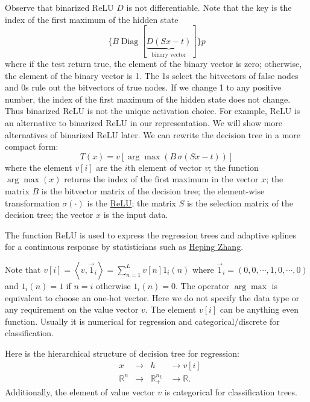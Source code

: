 \documentclass[UTF8]{article}
\begin{document}
Observe that binarized ReLU $D$ is not differentiable.
Note that the key is the index of the first maximum of the hidden state
$$\{B\operatorname{Diag}[\underbrace{D(Sx-t)}_{\text{binary vector}}]\}p$$
where if the test return true, the  element of the binary vector is zero;
otherwise, the element of the binary vector is 1.
The 1s select the bitvectors of false nodes and
0s rule out the bitvectors of true nodes.
If we change 1 to any positive number,
the index of the first maximum of the hidden state does not change.
Thus binarized ReLU is not the unique activation choice.
For example, ReLU is  an alternative to binarized ReLU in our representation.
We will show more alternatives of binarized ReLU later.
We can rewrite the decision tree in a more compact form:
\begin{equation}\label{tree}
T(x)=v[\arg\max(B\,\sigma(Sx-t))]
\end{equation}
where  the element $v[i]$ are the $i$th element of vector $v$;
the function $\arg\max(x)$ returns the index of the first maximum in the vector $x$;
the matrix $B$ is the bitvector matrix of the decision tree;
the element-wise transformation $\sigma(\cdot)$ is the \href{https://arxiv.org/abs/1611.01491}{ReLU};
the matrix $S$ is the selection matrix of the decision tree;
the vector $x$ is the input data.


The function ReLU is used to express the regression trees and adaptive splines for a continuous response
by statisticians such as \href{https://b-ok.cc/book/891461/09b3e3}{Heping Zhang}.

Note that $v[i]=\left<v,  \vec 1_i\right>=\sum_{n=1}^{L}v[n] 1_i(n)$
where $\vec 1_i=(0,0,\cdots,1,0,\cdots, 0)$
and $1_i(n)=1$ if $n=i$ otherwise $1_i(n)=0$.
The operator $\arg\max$ is equivalent to choose an one-hot vector.
Here we do not specify the data type or any requirement on the value vector $v$.
The element $v[i]$ can be anything even function.
Usually it is numerical for regression and
categorical/discrete for classification.


Here is the hierarchical  structure of decision tree for regression:
\begin{equation}
\begin{aligned}
&x            &\to &h &\to v[i]\\ \nonumber
&\mathbb{R}^n &\to &\mathbb{R}_{+}^{n_L}&\to \mathbb{R}. \nonumber
\end{aligned}
\end{equation}
Additionally, the element of value vector $v$ is categorical for classification trees.
\end{document}
